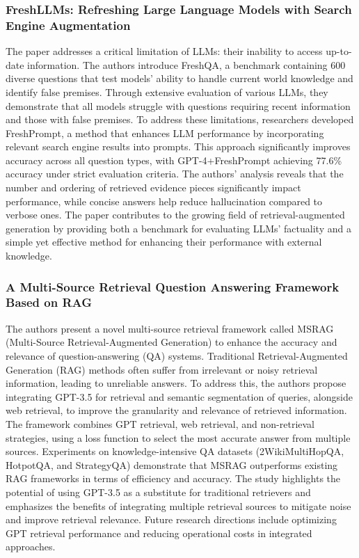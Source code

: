 \documentclass[fleqn,moreauthors,10pt]{ds_report}
\begin{document}
\subsubsection{FreshLLMs: Refreshing Large Language Models with Search Engine Augmentation}  
  
The paper addresses a critical limitation of LLMs: their inability to access up-to-date information. The authors introduce FreshQA, a benchmark containing 600 diverse questions that test models' ability to handle current world knowledge and identify false premises. Through extensive evaluation of various LLMs, they demonstrate that all models struggle with questions requiring recent information and those with false premises.  
To address these limitations, researchers developed FreshPrompt, a method that enhances LLM performance by incorporating relevant search engine results into prompts. This approach significantly improves accuracy across all question types, with GPT-4+FreshPrompt achieving 77.6\% accuracy under strict evaluation criteria. The authors' analysis reveals that the number and ordering of retrieved evidence pieces significantly impact performance, while concise answers help reduce hallucination compared to verbose ones.  
The paper contributes to the growing field of retrieval-augmented generation by providing both a benchmark for evaluating LLMs' factuality and a simple yet effective method for enhancing their performance with external knowledge. \cite{vu2023}  
  
\subsubsection{A Multi-Source Retrieval Question Answering  
Framework Based on RAG}  
  
The authors present a novel multi-source retrieval framework called MSRAG (Multi-Source Retrieval-Augmented Generation) to enhance the accuracy and relevance of question-answering (QA) systems. Traditional Retrieval-Augmented Generation (RAG) methods often suffer from irrelevant or noisy retrieval information, leading to unreliable answers. To address this, the authors propose integrating GPT-3.5 for retrieval and semantic segmentation of queries, alongside web retrieval, to improve the granularity and relevance of retrieved information. The framework combines GPT retrieval, web retrieval, and non-retrieval strategies, using a loss function to select the most accurate answer from multiple sources. Experiments on knowledge-intensive QA datasets (2WikiMultiHopQA, HotpotQA, and StrategyQA) demonstrate that MSRAG outperforms existing RAG frameworks in terms of efficiency and accuracy. The study highlights the potential of using GPT-3.5 as a substitute for traditional retrievers and emphasizes the benefits of integrating multiple retrieval sources to mitigate noise and improve retrieval relevance. Future research directions include optimizing GPT retrieval performance and reducing operational costs in integrated approaches. \cite{wu2024}  
  
\end{document}
